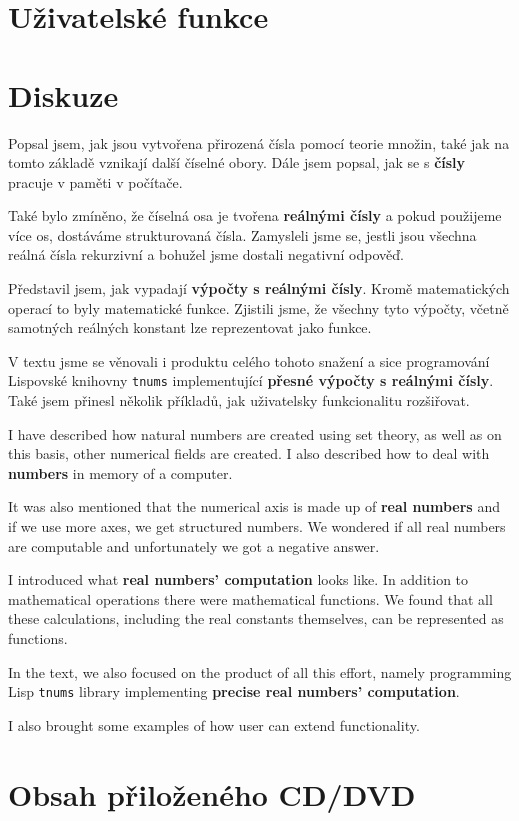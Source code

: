 \documentclass[
master=false,
field=inf,
encoding=utf8,
language=czech,
printversion=false,]{kidiplom}
\begin{document}
\section{Uživatelské funkce}

\clearpage
\section{Diskuze}

\begin{kiconclusions}
Popsal jsem, jak jsou vytvořena přirozená čísla pomocí teorie množin, také jak na tomto základě vznikají další číselné obory. Dále jsem popsal, jak se s \textbf{čísly} pracuje v paměti v počítače.

Také bylo zmíněno, že číselná osa je tvořena \textbf{reálnými čísly} a pokud použijeme více os, dostáváme strukturovaná čísla. Zamysleli jsme se, jestli jsou všechna reálná čísla rekurzivní a bohužel jsme dostali negativní odpověď.

Představil jsem, jak vypadají \textbf{výpočty s reálnými čísly}. Kromě matematických operací to byly matematické funkce. Zjistili jsme, že všechny tyto výpočty, včetně samotných reálných konstant lze reprezentovat jako funkce.

V textu jsme se věnovali i produktu celého tohoto snažení a sice programování Lispovské knihovny \texttt{tnums} implementující \textbf{přesné výpočty s reálnými čísly}. Také jsem přinesl několik příkladů, jak uživatelsky funkcionalitu rozšiřovat.
\end{kiconclusions}
\begin{kiconclusions}[english]
I have described how natural numbers are created using set theory, as well as on this basis, other numerical fields are created. I also described how to deal with \textbf{numbers} in memory of a computer.

It was also mentioned that the numerical axis is made up of \textbf{real numbers} and if we use more axes, we get structured numbers. We wondered if all real numbers are computable and unfortunately we got a negative answer.

I introduced what \textbf{real numbers' computation} looks like. In addition to mathematical operations there were mathematical functions. We found that all these calculations, including the real constants themselves, can be represented as functions.

In the text, we also focused on the product of all this effort, namely programming Lisp \texttt{tnums} library implementing \textbf{precise real numbers' computation}.

I also brought some examples of how user can extend functionality.
\end{kiconclusions}
\clearpage
\printbibliography[heading=bibintoc, title={Seznam literatury}]
\appendix
\section{Obsah přiloženého CD/DVD}\label{pril:adresar}

\end{document}
